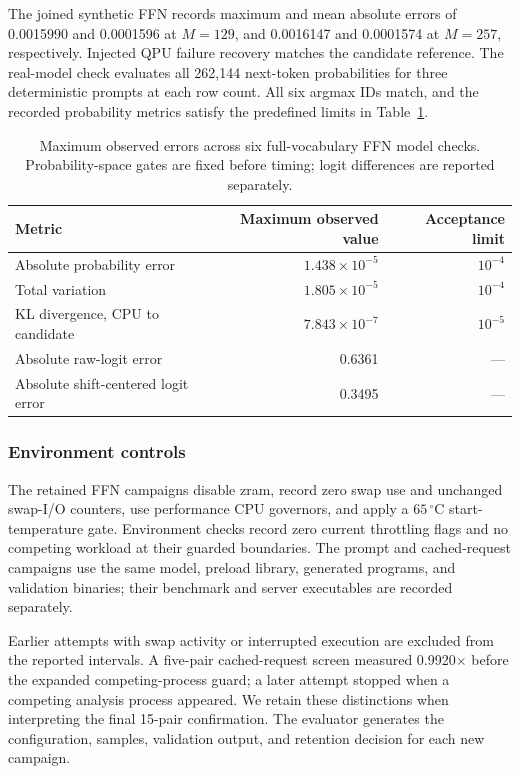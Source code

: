 \documentclass[sigplan,screen,review]{acmart}
\begin{document}
The joined synthetic FFN records maximum and mean absolute errors of
0.0015990 and 0.0001596 at $M=129$, and 0.0016147 and 0.0001574
at $M=257$, respectively. Injected QPU failure recovery matches the candidate reference. The real-model check evaluates all 262,144 next-token probabilities for three deterministic prompts at each row count. All six argmax IDs match, and the recorded probability metrics satisfy the predefined limits in Table~\ref{tab:ffn-validation}.

\begin{table}[t]
\centering
\caption{Maximum observed errors across six full-vocabulary FFN model checks. Probability-space gates are fixed before timing; logit differences are reported separately.}
\label{tab:ffn-validation}
\small
\begin{tabular}{@{}lrr@{}}
\toprule
Metric & Maximum observed value & Acceptance limit \\
\midrule
Absolute probability error & $1.438\times10^{-5}$ & $10^{-4}$ \\
Total variation & $1.805\times10^{-5}$ & $10^{-4}$ \\
KL divergence, CPU to candidate & $7.843\times10^{-7}$ & $10^{-5}$ \\
Absolute raw-logit error & 0.6361 & --- \\
Absolute shift-centered logit error & 0.3495 & --- \\
\bottomrule
\end{tabular}
\end{table}

\subsubsection{Environment controls}

The retained FFN campaigns disable zram, record zero swap use and unchanged swap-I/O counters, use performance CPU governors, and apply a \(65\,^\circ\mathrm{C}\) start-temperature gate. Environment checks record zero current throttling flags and no competing workload at their guarded boundaries. The prompt and cached-request campaigns use the same model, preload library, generated programs, and validation binaries; their benchmark and server executables are recorded separately.

Earlier attempts with swap activity or interrupted execution are excluded from the reported intervals. A five-pair cached-request screen measured 0.9920$\times$ before the expanded competing-process guard; a later attempt stopped when a competing analysis process appeared. We retain these distinctions when interpreting the final 15-pair confirmation. The evaluator generates the configuration, samples, validation output, and retention decision for each new campaign.
\end{document}
